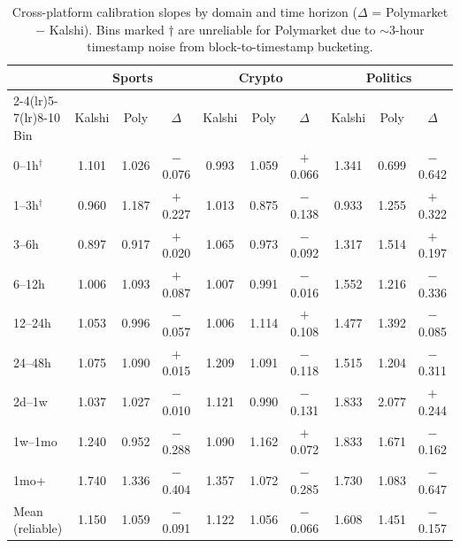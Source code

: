 \documentclass[11pt,a4paper]{article}
\begin{document}
\begin{table}[!ht]
\caption{Cross-platform calibration slopes by domain and time horizon ($\Delta$ = Polymarket $-$ Kalshi). Bins marked $\dagger$ are unreliable for Polymarket due to $\sim$3-hour timestamp noise from block-to-timestamp bucketing.\label{tab:cp_time}}
\centering
\small
\begin{tabular}{lccc@{\hspace{1.5em}}ccc@{\hspace{1.5em}}ccc}
\toprule
& \multicolumn{3}{c}{Sports} & \multicolumn{3}{c}{Crypto} & \multicolumn{3}{c}{Politics} \\
\cmidrule(lr){2-4}\cmidrule(lr){5-7}\cmidrule(lr){8-10}
Bin & Kalshi & Poly & $\Delta$ & Kalshi & Poly & $\Delta$ & Kalshi & Poly & $\Delta$ \\
\midrule
0--1h$^\dagger$  & 1.101 & 1.026 & $-$0.076 & 0.993 & 1.059 & $+$0.066 & 1.341 & 0.699 & $-$0.642 \\
1--3h$^\dagger$  & 0.960 & 1.187 & $+$0.227 & 1.013 & 0.875 & $-$0.138 & 0.933 & 1.255 & $+$0.322 \\
3--6h            & 0.897 & 0.917 & $+$0.020 & 1.065 & 0.973 & $-$0.092 & 1.317 & 1.514 & $+$0.197 \\
6--12h           & 1.006 & 1.093 & $+$0.087 & 1.007 & 0.991 & $-$0.016 & 1.552 & 1.216 & $-$0.336 \\
12--24h          & 1.053 & 0.996 & $-$0.057 & 1.006 & 1.114 & $+$0.108 & 1.477 & 1.392 & $-$0.085 \\
24--48h          & 1.075 & 1.090 & $+$0.015 & 1.209 & 1.091 & $-$0.118 & 1.515 & 1.204 & $-$0.311 \\
2d--1w           & 1.037 & 1.027 & $-$0.010 & 1.121 & 0.990 & $-$0.131 & 1.833 & 2.077 & $+$0.244 \\
1w--1mo          & 1.240 & 0.952 & $-$0.288 & 1.090 & 1.162 & $+$0.072 & 1.833 & 1.671 & $-$0.162 \\
1mo+             & 1.740 & 1.336 & $-$0.404 & 1.357 & 1.072 & $-$0.285 & 1.730 & 1.083 & $-$0.647 \\
\midrule
Mean (reliable)  & 1.150 & 1.059 & $-$0.091 & 1.122 & 1.056 & $-$0.066 & 1.608 & 1.451 & $-$0.157 \\
\bottomrule
\end{tabular}
\end{table}
\end{document}
